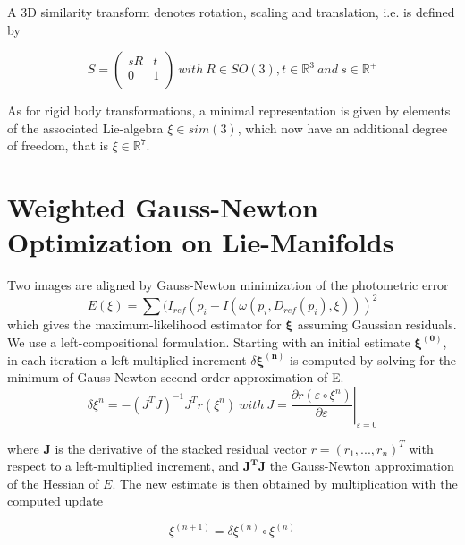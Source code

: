 A 3D similarity transform   denotes rotation, scaling and translation, i.e. is defined by

\begin{equation}
S=\left(
    \begin{array}{cc}
      sR & t \\
      0 & 1 \\
    \end{array}
  \right)
  \ with
  \ R\in SO(3),t\in {\mathbb{R}}^{3}
  \ and \ s\in {\mathbb{R}}^{+}
\end{equation}

As for rigid body transformations, a minimal representation is given by elements of the associated Lie-algebra $\xi  \in sim(3)$, which now have an additional degree of freedom, that is $\xi\in {\mathbb{R}}^{7}$.

\section{Weighted Gauss-Newton Optimization on Lie-Manifolds}
Two images are aligned by Gauss-Newton minimization of the photometric error
\begin{equation}
E(\xi)=\sum( I_{ref}(p_{i} - I( \omega( p_{i},D_{ref}(p_{i}),\xi ) ))^{2}
\end{equation}
which gives the maximum-likelihood estimator for ${\mathbf{\xi }}$ assuming Gaussian residuals. We use a left-compositional formulation. Starting with an initial estimate ${{\mathbf{\xi }}^{{\mathbf{(0)}}}}$, in each iteration a left-multiplied increment $\delta {{\mathbf{\xi }}^{{\mathbf{(n)}}}}$ is computed by solving for the minimum of Gauss-Newton second-order approximation of E.
\begin{equation}
\delta\xi^{n}=-(J^{T}J)^{-1}J^{T}r(\xi^{n}) \ with \  \left. J=\frac{\partial r(\varepsilon\circ\xi^{n})}{\partial \varepsilon} \right|_{\varepsilon=0}
\end{equation}

where ${\mathbf{J}}$ is the derivative of the stacked residual vector ${ r=(r_{1},...,r_{n})^{T} }$ with respect to a left-multiplied increment, and ${{\mathbf{J}}^{\mathbf{T}}}{\mathbf{J}}$ the Gauss-Newton approximation of the Hessian of $E$. The new estimate is then obtained by multiplication with the computed update

\begin{equation}
\xi ^{(n + 1)} = \delta \xi ^{(n)} \circ \xi ^{(n)}
\end{equation}

